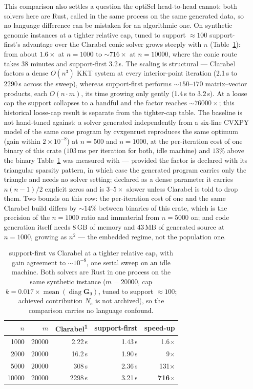 \documentclass[11pt]{article}
\newcommand{\bG}{\mathbf{G}}
\begin{document}
This comparison also settles a question the optiSel head-to-head cannot: both solvers here are Rust, called in the same process on the same generated data, so no language difference can be mistaken for an algorithmic one. On synthetic genomic instances at a tighter relative cap, tuned to support ${\approx}100$ support-first's advantage over the Clarabel conic solver grows steeply with $n$ (Table~\ref{tab:clarabel}): from about $1.6\times$ at $n=1000$ to ${\sim}716\times$ at $n=10000$, where the conic route takes 38 minutes and support-first 3.2\,s. The scaling is structural --- Clarabel factors a dense $O(n^3)$ KKT system at every interior-point iteration (2.1\,s to 2290\,s across the sweep), whereas support-first performs ${\sim}150$--$170$ matrix--vector products, each $O(n\cdot m)$, its time growing only gently (1.4\,s to 3.2\,s). At a loose cap the support collapses to a handful and the factor reaches ${\sim}76000\times$; this historical loose-cap result is separate from the tighter-cap table. The baseline is not hand-tuned against: a solver generated independently from a six-line CVXPY model of the same cone program by cvxgenrust reproduces the same optimum (gain within $2\times10^{-8}$) at $n=500$ and $n=1000$, at the per-iteration cost of one binary of this crate ($103$\,ms per iteration for both, idle machine) and $13\%$ above the binary Table~\ref{tab:clarabel} was measured with --- provided the factor is declared with its triangular sparsity pattern, in which case the generated program carries only the triangle and needs no solver setting; declared as a dense parameter it carries $n(n-1)/2$ explicit zeros and is $3$--$5\times$ slower unless Clarabel is told to drop them. Two bounds on this row: the per-iteration cost of one and the same Clarabel build differs by ${\sim}14\%$ between binaries of this crate, which is the precision of the $n=1000$ ratio and immaterial from $n=5000$ on; and code generation itself needs $8$\,GB of memory and $43$\,MB of generated source at $n=1000$, growing as $n^2$ --- the embedded regime, not the population one.

\begin{table}[ht]
\centering
\caption{support-first vs Clarabel at a tighter relative cap, with gain agreement to ${\sim}10^{-8}$, one serial sweep on an idle machine. Both solvers are Rust in one process on the same synthetic instance ($m=20000$, cap $k=0.017\times\operatorname{mean}(\operatorname{diag}\bG_0)$, tuned to support ${\approx}100$; achieved contribution $N_e$ is not archived), so the comparison carries no language confound.}
\label{tab:clarabel}
\begin{tabular}{rrrrr}
\toprule
$n$ & $m$ & Clarabel\textsuperscript{1} & support-first & speed-up \\
\midrule
1000  & 20000 & 2.22\,s   & 1.43\,s & 1.6$\times$ \\
2000  & 20000 & 16.2\,s   & 1.90\,s & 9$\times$ \\
5000  & 20000 & 308\,s    & 2.36\,s & 131$\times$ \\
10000 & 20000 & 2298\,s   & 3.21\,s & \textbf{716$\times$} \\
\bottomrule
\end{tabular}
\end{table}
\end{document}

